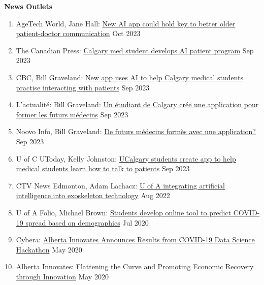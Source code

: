 \documentclass{article}
\begin{document}
\textbf{News Outlets} \vspace{.5em}
\begin{enumerate}
    \item AgeTech World, Jane Hall: \href{https://agetechworld-co-uk.cdn.ampproject.org/c/s/agetechworld.co.uk/news/new-ai-app-could-hold-key-to-better-older-patient-doctor-communication/?amp=1}{New AI app could hold key to better older patient-doctor communication} \hfill Oct 2023
    \item The Canadian Press: \href{https://www.youtube.com/watch?v=e8d3D5-pBSM&ab_channel=TheCanadianPress}{Calgary med student develops AI patient program} \hfill Sep 2023
    \item CBC, Bill Graveland: \href{https://www.cbc.ca/news/canada/calgary/ai-calgary-medical-students-app-skills-1.6975645}{New app uses AI to help Calgary medical students practise interacting with patients} \hfill Sep 2023
    \item L'actualit\'e: Bill Graveland: \href{https://lactualite.com/actualites/un-etudiant-de-calgary-cree-une-application-pour-former-les-futurs-medecins/}{Un \'etudiant de Calgary crée une application pour former les futurs m\'edecins} \hfill Sep 2023
    \item Noovo Info, Bill Graveland: \href{https://www.noovo.info/nouvelle/de-futurs-medecins-formes-avec-une-application.html}{De futurs m\'edecins form\`es avec une application?} \hfill Sep 2023
    \item U of C UToday, Kelly Johnston: \href{https://cumming.ucalgary.ca/news/ucalgary-students-create-app-help-medical-students-learn-how-talk-patients}{UCalgary students create app to help medical students learn how to talk to patients} \hfill Sep 2023
    \item CTV News Edmonton, Adam Lachacz: \href{U of A integrating artificial intelligence into exoskeleton technology}{U of A integrating artificial intelligence into exoskeleton technology} \hfill Aug 2022
    \item U of A Folio, Michael Brown: \href{https://www.ualberta.ca/folio/2020/07/students-develop-online-tool-to-predict-covid-19-spread-based-on-demographics.html}{Students develop online tool to predict COVID-19 spread based on demographics} \hfill Jul 2020
    \item Cybera: \href{https://www.cybera.ca/covid-19-data-science-hackathon-winners/}{Alberta Innovates Announces Results from COVID-19 Data Science Hackathon} \hfill May 2020
    \item Alberta Innovates: \href{https://albertainnovates.ca/news/flattening-the-curve-and-promoting-economic-recovery-through-innovation/}{Flattening the Curve and Promoting Economic Recovery through Innovation} \hfill May 2020

\end{enumerate}
\end{document}
